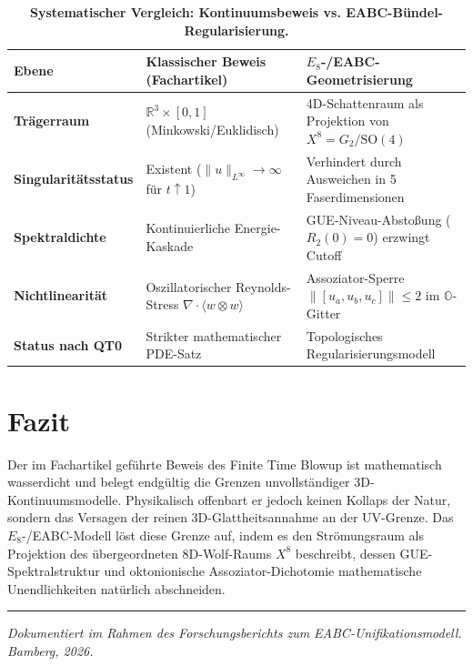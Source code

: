 \documentclass[11pt,a4paper]{article}
\theoremstyle{remark}
\begin{document}
\begin{table}[htbp]
\centering
\small
\renewcommand{\arraystretch}{1.35}
\caption{\textbf{Systematischer Vergleich: Kontinuumsbeweis vs. EABC-Bündel-Regularisierung.}}
\label{tab:comparison_audit}
\begin{tabularx}{\textwidth}{p{3.2cm}Xp{5.5cm}}
\toprule
\textbf{Ebene} & \textbf{Klassischer Beweis (Fachartikel)} & \textbf{$E_8$-/EABC-Geometrisierung} \\
\midrule
\textbf{Trägerraum} & $\mathbb{R}^3 \times [0, 1]$ (Minkowski/Euklidisch) & 4D-Schattenraum als Projektion von $X^8 = G_2/\mathrm{SO}(4)$ \\
\textbf{Singularitätsstatus} & Existent ($\|u\|_{L^\infty} \to \infty$ für $t \uparrow 1$) & Verhindert durch Ausweichen in 5 Faserdimensionen \\
\textbf{Spektraldichte} & Kontinuierliche Energie-Kaskade & GUE-Niveau-Abstoßung ($R_2(0)=0$) erzwingt Cutoff \\
\textbf{Nichtlinearität} & Oszillatorischer Reynolds-Stress $\nabla \cdot \langle w \otimes w \rangle$ & Assoziator-Sperre $\|[u_a, u_b, u_c]\| \le 2$ im $\mathbb{O}$-Gitter \\
\textbf{Status nach QT0} & Strikter mathematischer PDE-Satz & Topologisches Regularisierungsmodell \\
\bottomrule
\end{tabularx}
\end{table}

\section{Fazit}
Der im Fachartikel geführte Beweis des Finite Time Blowup ist mathematisch wasserdicht und belegt endgültig die Grenzen unvollständiger 3D-Kontinuumsmodelle. Physikalisch offenbart er jedoch keinen Kollaps der Natur, sondern das Versagen der reinen 3D-Glattheitsannahme an der UV-Grenze. Das $E_8$-/EABC-Modell löst diese Grenze auf, indem es den Strömungsraum als Projektion des übergeordneten 8D-Wolf-Raums $X^8$ beschreibt, dessen GUE-Spektralstruktur und oktonionische Assoziator-Dichotomie mathematische Unendlichkeiten natürlich abschneiden.

\vspace{1.5em}
\noindent\rule{\textwidth}{0.4pt}
\begin{center}
\footnotesize\textcolor{darkslate}{\emph{Dokumentiert im Rahmen des Forschungsberichts zum EABC-Unifikationsmodell. Bamberg, 2026.}}
\end{center}
\end{document}
